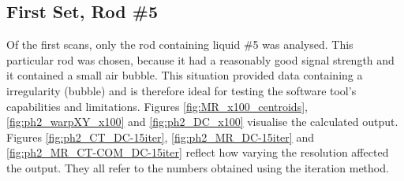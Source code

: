 \subsection{First Set, Rod \#5}

Of the first scans, only the rod containing liquid \#5 was analysed.
This particular rod was chosen, because it had a reasonably good signal strength and it contained a small air bubble.
This situation provided data containing a irregularity (bubble) and is therefore ideal for testing the software tool's capabilities and limitations.
Figures \ref{fig:MR_x100_centroids}, \ref{fig:ph2_warpXY_x100} and \ref{fig:ph2_DC_x100} visualise the calculated output.
Figures \ref{fig:ph2_CT_DC-15iter},  \ref{fig:ph2_MR_DC-15iter} and \ref{fig:ph2_MR_CT-COM_DC-15iter} reflect how varying the resolution affected the output.
They all refer to the numbers obtained using the iteration method.

